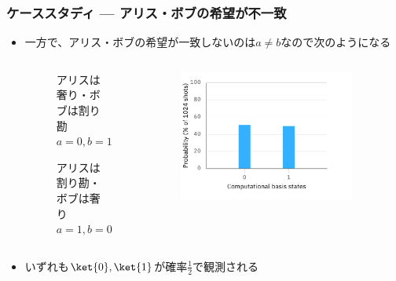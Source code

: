 \begin{frame}
  \frametitle{ケーススタディ --- アリス・ボブの希望が不一致}

  \begin{itemize}
    \item 一方で、アリス・ボブの希望が一致しないのは$a \ne b$なので次のようになる
    \begin{columns}
      \begin{column}{0.6\textwidth}
        \begin{figure}
          \centering
          \vspace{2ex}
          \caption{アリスは奢り・ボブは割り勘$a = 0, b = 1$}
          \label{fig:a_eq_0_b_eq_1}
        \end{figure}

        \begin{figure}
          \centering
          \vspace{2ex}
          \caption{アリスは割り勘・ボブは奢り$a = 1, b = 0$}
          \label{fig:a_eq_1_b_eq_0}
        \end{figure}
      \end{column}
      \begin{column}{0.4\textwidth}
        \begin{figure}
          \includegraphics[width=0.9\textwidth]{./img/a_ne_b_histogram.pdf}
        \end{figure}
      \end{column}
    \end{columns}
  
    \item いずれも$\ket{0}, \ket{1}$が確率$\frac{1}{2}$で観測される
  \end{itemize}
\end{frame}

